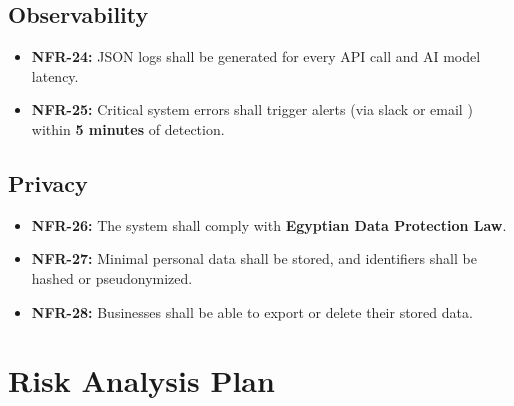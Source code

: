 \documentclass[12pt,a4paper]{article}
\begin{document}
\subsection{Observability}

\begin{itemize}[leftmargin=2cm]
    \item \textbf{NFR-24:} JSON logs shall be generated for every API call and AI model latency.
    \item \textbf{NFR-25:} Critical system errors shall trigger alerts (via slack or email ) within \textbf{5 minutes} of detection.
\end{itemize}

\subsection{Privacy}

\begin{itemize}[leftmargin=2cm]
    \item \textbf{NFR-26:} The system shall comply with \textbf{Egyptian Data Protection Law}.
    \item \textbf{NFR-27:} Minimal personal data shall be stored, and identifiers shall be hashed or pseudonymized.
    \item \textbf{NFR-28:} Businesses shall be able to export or delete their stored data.
\end{itemize}


\section{Risk Analysis Plan}

\renewcommand{\arraystretch}{1.3}
\end{document}
